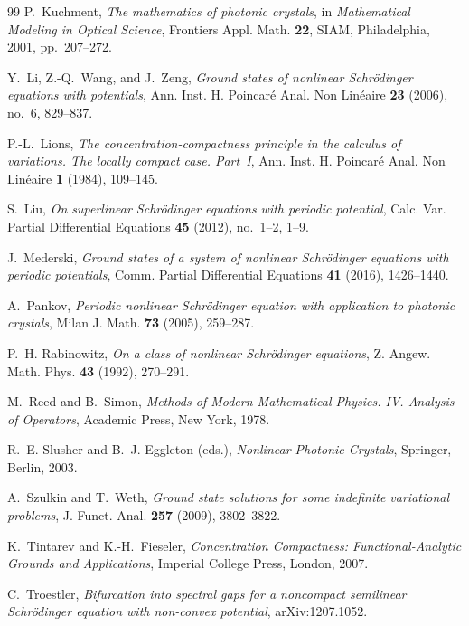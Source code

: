 \documentclass[11pt]{amsart}
\numberwithin{equation}{section}
\theoremstyle{definition}
\begin{document}
\begin{thebibliography}{99}
P.~Kuchment,
\emph{The mathematics of photonic crystals},
in \emph{Mathematical Modeling in Optical Science}, Frontiers Appl. Math. \textbf{22},
SIAM, Philadelphia, 2001, pp.~207--272.

Y.~Li, Z.-Q.~Wang, and J.~Zeng,
\emph{Ground states of nonlinear Schrödinger equations with potentials},
Ann. Inst. H. Poincaré Anal. Non Linéaire \textbf{23} (2006), no.~6, 829--837.

P.-L.~Lions,
\emph{The concentration-compactness principle in the calculus of variations. The locally compact case. Part~I},
Ann. Inst. H. Poincaré Anal. Non Linéaire \textbf{1} (1984), 109--145.

S.~Liu,
\emph{On superlinear Schrödinger equations with periodic potential},
Calc. Var. Partial Differential Equations \textbf{45} (2012), no.~1--2, 1--9.

J.~Mederski,
\emph{Ground states of a system of nonlinear Schrödinger equations with periodic potentials},
Comm. Partial Differential Equations \textbf{41} (2016), 1426--1440.

A.~Pankov,
\emph{Periodic nonlinear Schrödinger equation with application to photonic crystals},
Milan J. Math. \textbf{73} (2005), 259--287.

P.~H. Rabinowitz,
\emph{On a class of nonlinear Schrödinger equations},
Z. Angew. Math. Phys. \textbf{43} (1992), 270--291.

M.~Reed and B.~Simon,
\emph{Methods of Modern Mathematical Physics. IV. Analysis of Operators},
Academic Press, New York, 1978.

R.~E. Slusher and B.~J. Eggleton (eds.),
\emph{Nonlinear Photonic Crystals},
Springer, Berlin, 2003.

A.~Szulkin and T.~Weth,
\emph{Ground state solutions for some indefinite variational problems},
J. Funct. Anal. \textbf{257} (2009), 3802--3822.

K.~Tintarev and K.-H.~Fieseler,
\emph{Concentration Compactness: Functional-Analytic Grounds and Applications},
Imperial College Press, London, 2007.

C.~Troestler,
\emph{Bifurcation into spectral gaps for a noncompact semilinear Schrödinger equation with non-convex potential},
arXiv:1207.1052.

\end{thebibliography}
\end{document}
